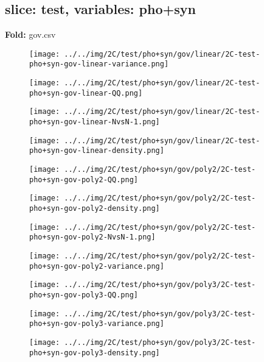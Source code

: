 \subsection{slice: test, variables: pho+syn}
\textbf{Fold:} gov.csv
\begin{figure}[H]
\centering	\texttt{[image: ../../img/2C/test/pho+syn/gov/linear/2C-test-pho+syn-gov-linear-variance.png]}
\end{figure}
\begin{figure}[H]
\centering	\texttt{[image: ../../img/2C/test/pho+syn/gov/linear/2C-test-pho+syn-gov-linear-QQ.png]}
\end{figure}
\begin{figure}[H]
\centering	\texttt{[image: ../../img/2C/test/pho+syn/gov/linear/2C-test-pho+syn-gov-linear-NvsN-1.png]}
\end{figure}
\begin{figure}[H]
\centering	\texttt{[image: ../../img/2C/test/pho+syn/gov/linear/2C-test-pho+syn-gov-linear-density.png]}
\end{figure}
\begin{figure}[H]
\centering	\texttt{[image: ../../img/2C/test/pho+syn/gov/poly2/2C-test-pho+syn-gov-poly2-QQ.png]}
\end{figure}
\begin{figure}[H]
\centering	\texttt{[image: ../../img/2C/test/pho+syn/gov/poly2/2C-test-pho+syn-gov-poly2-density.png]}
\end{figure}
\begin{figure}[H]
\centering	\texttt{[image: ../../img/2C/test/pho+syn/gov/poly2/2C-test-pho+syn-gov-poly2-NvsN-1.png]}
\end{figure}
\begin{figure}[H]
\centering	\texttt{[image: ../../img/2C/test/pho+syn/gov/poly2/2C-test-pho+syn-gov-poly2-variance.png]}
\end{figure}
\begin{figure}[H]
\centering	\texttt{[image: ../../img/2C/test/pho+syn/gov/poly3/2C-test-pho+syn-gov-poly3-QQ.png]}
\end{figure}
\begin{figure}[H]
\centering	\texttt{[image: ../../img/2C/test/pho+syn/gov/poly3/2C-test-pho+syn-gov-poly3-variance.png]}
\end{figure}
\begin{figure}[H]
\centering	\texttt{[image: ../../img/2C/test/pho+syn/gov/poly3/2C-test-pho+syn-gov-poly3-density.png]}
\end{figure}
